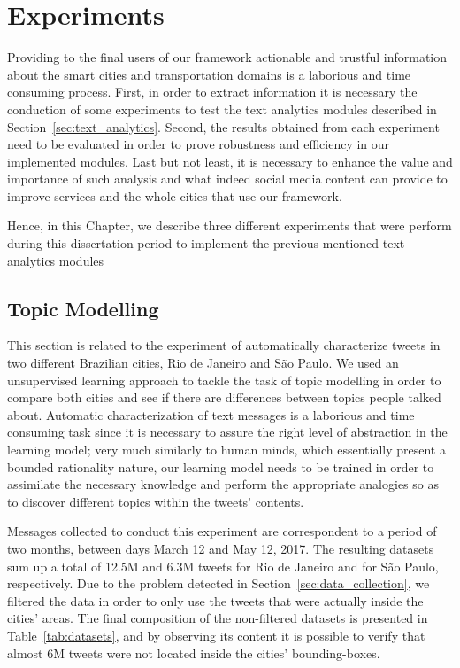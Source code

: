 \chapter{Experiments}
\label{chap:experiments}

\minitoc \mtcskip \noindent

Providing to the final users of our framework actionable and trustful information about the smart cities and transportation domains is a laborious and time consuming process. First, in order to extract information it is necessary the conduction of some experiments to test the text analytics modules described in Section~\ref{sec:text_analytics}. Second, the results obtained from each experiment need to be evaluated in order to prove robustness and efficiency in our implemented modules. Last but not least, it is necessary to enhance the value and importance of such analysis and what indeed social media content can provide to improve services and the whole cities that use our framework.

Hence, in this Chapter, we describe three different experiments that were perform during this dissertation period to implement the previous mentioned text analytics modules

\section{Topic Modelling}\label{sec:topic_modeling}
This section is related to the experiment of automatically characterize tweets in two different Brazilian cities, Rio de Janeiro and São Paulo. We used an unsupervised learning approach to tackle the task of topic modelling in order to compare both cities and see if there are differences between topics people talked about. Automatic characterization of text messages is a laborious and time consuming task since it is necessary to assure the right level of abstraction in the learning model; very much similarly to human minds, which essentially present a bounded rationality nature, our learning model needs to be trained in order to assimilate the necessary knowledge and perform the appropriate analogies so as to discover different topics within the tweets' contents.

Messages collected to conduct this experiment are correspondent to a period of two months, between days March 12 and May 12, 2017. The resulting datasets sum up a total of 12.5M and 6.3M tweets for Rio de Janeiro and for São Paulo, respectively. Due to the problem detected in Section~\ref{sec:data_collection}, we filtered the data in order to only use the tweets that were actually inside the cities' areas. The final composition of the non-filtered datasets is presented in Table~\ref{tab:datasets}, and by observing its content it is possible to verify that almost 6M tweets were not located inside the cities' bounding-boxes.

